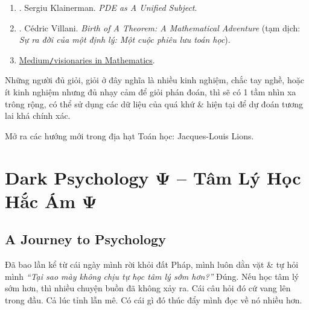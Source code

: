 \documentclass[12pt,oneside]{book}
\begin{document}
\begin{enumerate}
	\item \cite{Klainerman2000}. {\sc Sergiu Klainerman}. {\it PDE as A Unified Subject}.
	\item \cite{Villani2015}. {\sc C\'edric Villani}. {\it Birth  of A Theorem: A Mathematical Adventure} (tạm dịch: {\it Sự ra đời của một định lý: Một cuộc phiêu lưu toán học}).
	\item \href{https://medium.com/science-uncovered/visionaries-in-mathematics-a45138a76486}{Medium{\tt/}visionaries in Mathematics}.
\end{enumerate}
Những người đủ giỏi, giỏi ở đây nghĩa là nhiều kinh nghiệm, chắc tay nghề, hoặc ít kinh nghiệm nhưng đủ nhạy cảm để giỏi phán đoán, thì sẽ có 1 tầm nhìn xa trông rộng, có thể sử dụng các dữ liệu của quá khứ \& hiện tại để dự đoán tương lai khá chính xác.

Mở ra các hướng mới trong địa hạt Toán học: {\sc Jacques-Louis Lions}.


\chapter{Dark Psychology $\boldsymbol{\Psi}$ -- Tâm Lý Học Hắc Ám $\boldsymbol{\Psi}$}
\minitoc

\section{A Journey to Psychology}
Đã bao lần kể từ cái ngày mình rời khỏi đất Pháp, mình luôn dằn vặt \& tự hỏi mình {\it ``Tại sao mày không chịu tự học tâm lý sớm hơn?''} Đúng. Nếu học tâm lý sớm hơn, thì nhiều chuyện buồn đã không xảy ra. Cái câu hỏi đó cứ vang lên trong đầu. Cả lúc tỉnh lẫn mê. Có cái gì đó thúc đẩy mình đọc về nó nhiều hơn.
\end{document}
